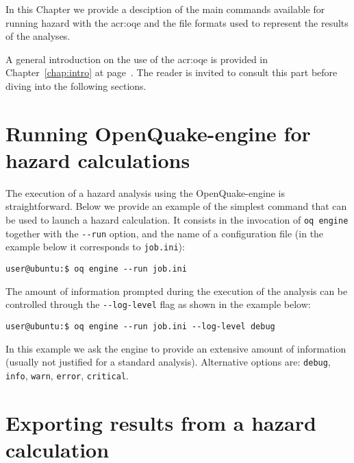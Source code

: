In this Chapter we provide a desciption of the main commands available for
running hazard with the \gls{acr:oqe} and the file formats used to represent
the results of the analyses.

A general introduction on the use of the \glsdesc{acr:oqe} is provided in
Chapter~\ref{chap:intro} at page~\pageref{chap:intro}. The
reader is invited to consult this part before diving into the following
sections.


\section{Running OpenQuake-engine for hazard calculations}
\label{sec:running_hazard_calculations}

The execution of a hazard analysis using the OpenQuake-engine is
straightforward. Below we provide an example of the simplest command that can be
used to launch a hazard calculation. It consists in the invocation of \texttt
{oq engine} together with the \texttt{-{}-run} option,
and the name of a configuration file (in the example below it
corresponds to \texttt{job.ini}):

\begin{verbatim}
user@ubuntu:$ oq engine --run job.ini
\end{verbatim}

The amount of information prompted during the execution of the analysis can be
controlled through the \texttt{-{}-log-level} flag as shown in the example below:

\begin{verbatim}
user@ubuntu:$ oq engine --run job.ini --log-level debug
\end{verbatim}

In this example we ask the engine to provide an extensive amount of information
(usually not justified for a standard analysis). Alternative options are:
\texttt{debug}, \texttt{info}, \texttt{warn}, \texttt{error},
\texttt{critical}.


\section{Exporting results from a hazard calculation}
\label{sec:exporting_hazard_results}

